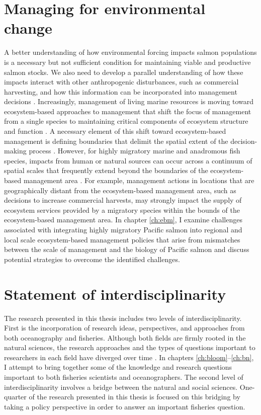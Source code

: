 \section{Managing for environmental change}

A better understanding of how environmental forcing impacts salmon populations
is a necessary but not sufficient condition for maintaining viable and
productive salmon stocks. We also need to develop a parallel understanding of
how these impacts interact with other anthropogenic disturbances, such as
commercial harvesting, and how this information can be incorporated into
management decisions \citep{Link2002a}. Increasingly, management of living
marine resources is moving toward ecosystem-based approaches to management that
shift the focus of management from a single species to maintaining critical
components of ecosystem structure and function \citep{Grumbine1994,
Murawski2007a, Long2015}. A necessary element of this shift toward
ecosystem-based management is defining boundaries that delimit the spatial
extent of the decision-making process \citep{Engler2015, Yaffee1999}. However,
for highly migratory marine and anadromous fish species, impacts from human or
natural sources can occur across a continuum of spatial scales that frequently
extend beyond the boundaries of the ecosystem-based management area
\citep{Dallimer2015}. For example, management actions in locations that are
geographically distant from the ecosystem-based management area, such as
decisions to increase commercial harvests, may strongly impact the supply of
ecosystem services provided by a migratory species within the bounds of the
ecosystem-based management area. In chapter \ref{ch:ebm}, I examine challenges
associated with integrating highly migratory Pacific salmon into regional and
local scale ecosystem-based management policies that arise from mismatches
between the scale of management and the biology of Pacific salmon and discuss
potential strategies to overcome the identified challenges.


\section{Statement of interdisciplinarity}

The research presented in this thesis includes two levels of
interdisciplinarity. First is the incorporation of research ideas, perspectives,
and approaches from both oceanography and fisheries. Although both fields are
firmly rooted in the natural sciences, the research approaches and the types of
questions important to researchers in each field have diverged over time
\citep{Platt2007a}. In chapters \ref{ch:bloom}--\ref{ch:bn}, I attempt to
bring together some of the knowledge and research questions important to both
fisheries scientists and oceanographers. The second level of interdisciplinarity
involves a bridge between the natural and social sciences. One-quarter of the
research presented in this thesis is focused on this bridging by taking a policy
perspective in order to answer an important fisheries question.


